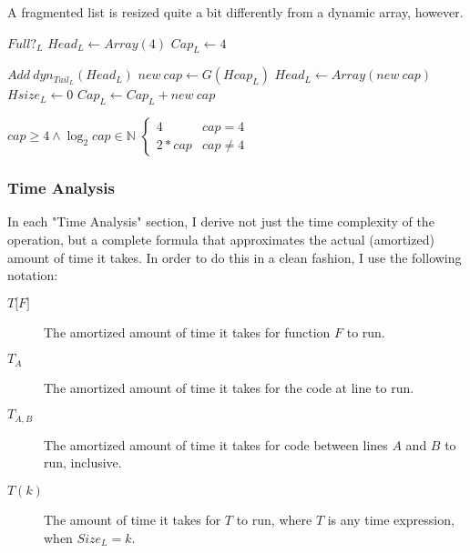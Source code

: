 \documentclass{article}
\newcommand{\head}{
	\ensuremath{Head_L}
}
\newcommand{\tail}{
	\ensuremath{Tail_L}
}
\newcommand{\size}{
	\ensuremath{Size_L}
}
\newcommand{\capacity}{
	\ensuremath{Cap_L}
}
\newcommand{\headsize}{
	\ensuremath{Hsize_L}
}
\newcommand{\headcapacity}{
	\ensuremath{Hcap_L}
}
\newcommand{\isempty}{
	\ensuremath{Empty?_L}
}
\newcommand{\isfull}{
	\ensuremath{Full?_L}
}
\newcommand{\timeof}[1]{
	\ensuremath{T\big[#1\big]}
}
\begin{document}
	A fragmented list is resized quite a bit differently from a dynamic array, however. %
	
	\begin{algorithm}\begin{algorithmic}[1]
				\Require
					\Statex $\isfull$
				\If{$\isempty$}
					\State $\head \gets Array(4)$
					\State $\capacity \gets 4$
					\State \Return
				\EndIf
			
				\State $Add\ dyn_{\tail}(\head)$
				\State $new\ cap \gets G(\headcapacity)$
				\State $\head \gets Array(new\ cap)$
				\State $\headsize \gets 0$
				\State $\capacity \gets \capacity + new\ cap$
			\EndProcedure
		\end{algorithmic}\end{algorithm}
	
	\begin{algorithm}\begin{algorithmic}[1]
			\Require
			\Statex $cap \geq 4 \land \log_2{cap} \in \mathbb{N}$
			\State \Return $\begin{cases}
			4 & cap = 4\\
			2 * cap & cap \neq 4
			\end{cases}$
			\EndFunction
		\end{algorithmic}\end{algorithm}
	
	\subsubsection{Time Analysis}
	
	In each "Time Analysis" section, I derive not just the time complexity of the operation, but a complete formula that approximates the actual (amortized) amount of time it takes. In order to do this in a clean fashion, I use the following notation:
	
	\begin{description}
		\item[$\timeof{F}$] The amortized amount of time it takes for function $F$ to run.
		\item[$T_A$] The amortized amount of time it takes for the code at line to run.
		\item[$T_{A,B}$] The amortized amount of time it takes for code between lines $A$ and $B$ to run, inclusive.
		\item[$T(k)$] The amount of time it takes for $T$ to run, where $T$ is any time expression, when $\size = k$.
	\end{description}
\end{document}
